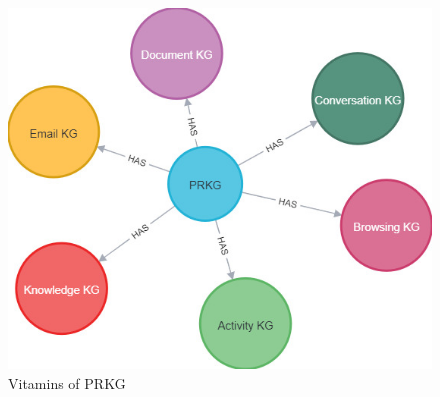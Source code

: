 \documentclass[11pt,pdftex]{article}
\begin{document}
\begin{figure}[!htbp]
    \centering
    \includegraphics[width=0.68\linewidth]{submissions/Sudakshina2023/figs/PRKG_Components.jpg}
    \caption{Vitamins of PRKG}
    \label{fig:vitaminsPRKG}
\end{figure}
\end{document}
